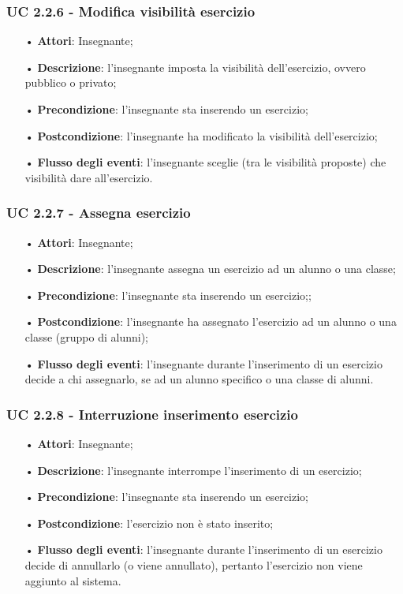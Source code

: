 \subsubsection{UC 2.2.6 - Modifica visibilità esercizio}
\begin{itemize}
	\item[•] \textbf{Attori}: Insegnante;
	\item[•] \textbf{Descrizione}: l'insegnante imposta la visibilità dell'esercizio, ovvero pubblico o privato;
	\item[•] \textbf{Precondizione}: l'insegnante sta inserendo un esercizio;
	\item[•] \textbf{Postcondizione}: l'insegnante ha modificato la visibilità dell'esercizio;
	\item[•] \textbf{Flusso degli eventi}: l'insegnante sceglie (tra le visibilità proposte) che visibilità dare all'esercizio.
\end{itemize}


\subsubsection{UC 2.2.7 - Assegna esercizio} 
\begin{itemize}
	\item[•] \textbf{Attori}: Insegnante;
	\item[•] \textbf{Descrizione}: l'insegnante assegna un esercizio ad un alunno o una classe;
	\item[•] \textbf{Precondizione}: l'insegnante sta inserendo un esercizio;;
	\item[•] \textbf{Postcondizione}: l'insegnante ha assegnato l'esercizio ad un alunno o una classe (gruppo di alunni);
	\item[•] \textbf{Flusso degli eventi}: l'insegnante durante l'inserimento di un esercizio decide a chi assegnarlo, se ad un alunno specifico o una classe di alunni.
\end{itemize}

\subsubsection{UC 2.2.8 - Interruzione inserimento esercizio}
\begin{itemize}
	\item[•] \textbf{Attori}: Insegnante;
	\item[•] \textbf{Descrizione}: l'insegnante interrompe l'inserimento di un esercizio;
	\item[•] \textbf{Precondizione}: l'insegnante sta inserendo un esercizio;
	\item[•] \textbf{Postcondizione}: l'esercizio non è stato inserito;
	\item[•] \textbf{Flusso degli eventi}: l'insegnante durante l'inserimento di un esercizio decide di annullarlo (o viene annullato), pertanto l'esercizio non viene aggiunto al sistema.
\end{itemize}

